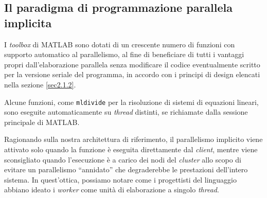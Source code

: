 \nocite{MathWorksParallelQuickStart}
\subsection{Il paradigma di programmazione parallela implicita}
I \textit{toolbox} di MATLAB sono dotati di un crescente numero di funzioni con supporto automatico al parallelismo, al fine di beneficiare di tutti 
i vantaggi propri dall'elaborazione parallela senza modificare il codice eventualmente scritto per la versione seriale del programma, in accordo con i principi di design elencati 
nella sezione \ref{sec2.1.2}. 

Alcune funzioni, come \lstinline|mldivide| per la risoluzione di sistemi di equazioni lineari, sono eseguite automaticamente su \textit{thread} 
distinti, se richiamate dalla sessione principale di MATLAB. 

Ragionando sulla nostra architettura di riferimento, il parallelismo implicito viene attivato solo quando la funzione \`e eseguita direttamente dal \textit{client}, 
mentre viene sconsigliato quando l'esecuzione \`e a carico dei nodi del \textit{cluster} allo scopo di evitare un parallelismo \enquote{annidato} che degraderebbe le prestazioni 
dell'intero sistema. \newline
In quest'ottica, possiamo notare come i progettisti del linguaggio abbiano ideato i \textit{worker} come unit\`a di elaborazione a singolo \textit{thread}.

